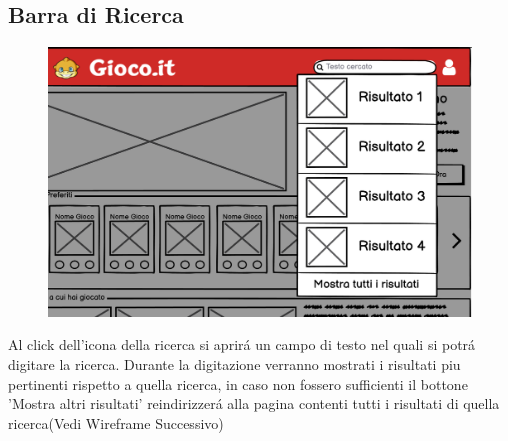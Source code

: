 \documentclass[../Report.tex]{subfiles}
\begin{document}
    \subsection{Barra di Ricerca}
    \begin{figure}[H]
        \includegraphics[width=\linewidth]{WSearchBar.png}
        \centering
    \end{figure}
    
    Al click dell'icona della ricerca si aprirá un campo di testo nel quali si potrá digitare la ricerca.
    Durante la digitazione verranno mostrati i risultati piu pertinenti rispetto a quella ricerca, in caso non fossero sufficienti il bottone 'Mostra altri risultati' reindirizzerá alla pagina contenti tutti i risultati di quella ricerca(Vedi Wireframe Successivo)
\end{document}
